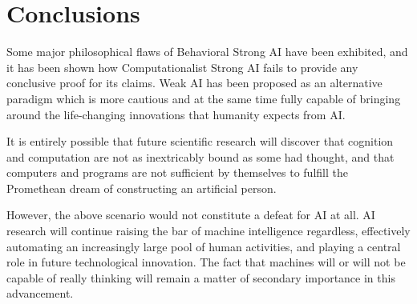 \documentclass{article}
\begin{document}
\section{Conclusions}

Some major philosophical flaws of Behavioral Strong AI have been exhibited, and it has been shown how Computationalist Strong AI fails to provide any conclusive proof for its claims. Weak AI has been proposed as an alternative paradigm which is more cautious and at the same time fully capable of bringing around the life-changing innovations that humanity expects from AI.

It is entirely possible that future scientific research will discover that cognition and computation are not as inextricably bound as some had thought, and that computers and programs are not sufficient by themselves to fulfill the Promethean dream of constructing an artificial person.

However, the above scenario would not constitute a defeat for AI at all.  AI research will continue raising the bar of machine intelligence regardless, effectively automating an increasingly large pool of human activities, and playing a central role in future technological innovation. The fact that machines will or will not be capable of really thinking will remain a matter of secondary importance in this advancement.



\end{document}
